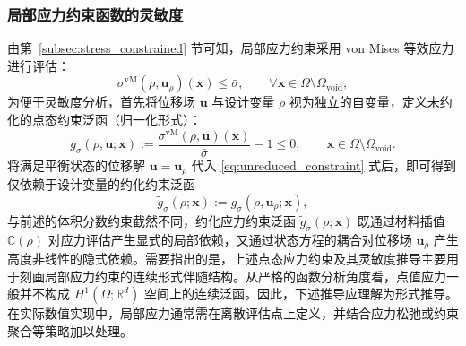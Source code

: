 \subsubsection*{局部应力约束函数的灵敏度}

由第~\ref{subsec:stress_constrained} 节可知，局部应力约束采用 von Mises 等效应力进行评估：
\[
\sigma^{\mathrm{vM}}(\rho, \boldsymbol{u}_\rho)(\boldsymbol{x}) \le \bar{\sigma}, \qquad  \forall \boldsymbol{x}\in \Omega\setminus\Omega_{\mathrm{void}},
\]
为便于灵敏度分析，首先将位移场 $\boldsymbol{u}$ 与设计变量 $\rho$ 视为独立的自变量，定义未约化的点态约束泛函（归一化形式）：
\begin{equation}
	g_\sigma(\rho, \boldsymbol{u}; \boldsymbol{x}) := \frac{\sigma^{\mathrm{vM}}(\rho, \boldsymbol{u})(\boldsymbol{x})}{\bar{\sigma}} - 1 \le 0, \qquad \boldsymbol{x}\in \Omega\setminus\Omega_{\mathrm{void}}.
	\label{eq:unreduced_constraint}
\end{equation}
将满足平衡状态的位移解 $\boldsymbol{u} = \boldsymbol{u}_\rho$ 代入 \eqref{eq:unreduced_constraint} 式后，即可得到仅依赖于设计变量的约化约束泛函
\[
\tilde g_\sigma(\rho;\boldsymbol{x}) := g_\sigma(\rho,\boldsymbol{u}_\rho;\boldsymbol{x}),
\]
与前述的体积分数约束截然不同，约化应力约束泛函 $\tilde{g}_\sigma(\rho; \boldsymbol{x})$ 既通过材料插值 $\mathbb{C}(\rho)$ 对应力评估产生显式的局部依赖，又通过状态方程的耦合对位移场 $\boldsymbol{u}_\rho$ 产生高度非线性的隐式依赖。需要指出的是，上述点态应力约束及其灵敏度推导主要用于刻画局部应力约束的连续形式伴随结构。从严格的函数分析角度看，点值应力一般并不构成 $H^1(\Omega;\mathbb{R}^d)$ 空间上的连续泛函。因此，下述推导应理解为形式推导。在实际数值实现中，局部应力通常需在离散评估点上定义，并结合应力松弛或约束聚合等策略加以处理。

